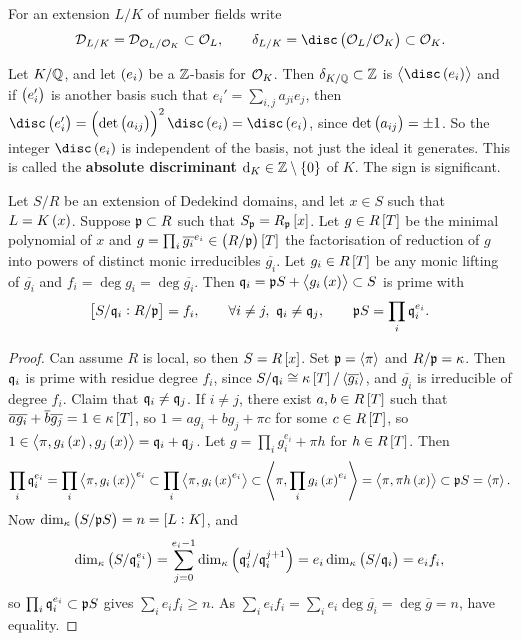 For an extension $ L / K $ of number fields write
$$ \DDD_{L / K} = \DDD_{\OOO_L / \OOO_K} \subset \OOO_L, \qquad \delta_{L / K} = \disc\br{\OOO_L / \OOO_K} \subset \OOO_K. $$

\begin{remark*}
Let $ K / \mathbb{Q} $, and let $ \br{e_i} $ be a $ \mathbb{Z} $-basis for $ \mathcal{O}_K $. Then $ \delta_{K / \mathbb{Q}} \subset \mathbb{Z} $ is $ \abr{\disc \br{e_i}} $ and if $ \br{e_i'} $ is another basis such that $ e_i' = \sum_{i, j} a_{ji}e_j $, then $ \disc \br{e_i'} = \br{\det \br{a_{ij}}}^2\disc \br{e_i} = \disc \br{e_i} $, since $ \det \br{a_{ij}} = \pm 1 $. So the integer $ \disc \br{e_i} $ is independent of the basis, not just the ideal it generates. This is called the \textbf{absolute discriminant} $ \d_K \in \ZZ \setminus \cbr{0} $ of $ K $. The sign is significant.
\end{remark*}

\begin{theorem}
Let $ S / R $ be an extension of Dedekind domains, and let $ x \in S $ such that $ L = K\br{x} $. Suppose $ \mathfrak{p} \subset R $ such that $ S_\ppp = R_\ppp\sbr{x} $. Let $ g \in R\sbr{T} $ be the minimal polynomial of $ x $ and $ g = \prod_i \overline{g_i}^{e_i} \in \br{R / \ppp}\sbr{T} $ the factorisation of reduction of $ g $ into powers of distinct monic irreducibles $ \overline{g_i} $. Let $ g_i \in R\sbr{T} $ be any monic lifting of $ \overline{g_i} $ and $ f_i = \deg g_i = \deg \overline{g_i} $. Then $ \qqq_i = \ppp S + \abr{g_i\br{x}} \subset S $ is prime with
$$ \sbr{S / \qqq_i : R / \ppp} = f_i, \qquad \forall i \ne j, \ \qqq_i \ne \qqq_j, \qquad \ppp S = \prod_i \qqq_i^{e_i}. $$
\end{theorem}

\begin{proof}
Can assume $ R $ is local, so then $ S = R\sbr{x} $. Set $ \mathfrak{p} = \left\langle \pi \right\rangle $ and $ R / \mathfrak{p} = \kappa $. Then $ \mathfrak{q}_i $ is prime with residue degree $ f_i $, since $ S / \qqq_i \cong \kappa\sbr{T} / \abr{\overline{g_i}} $, and $ \overline{g_i} $ is irreducible of degree $ f_i $. Claim that $ \mathfrak{q}_i \ne \mathfrak{q}_j $. If $ i \ne j $, there exist $ a, b \in R\sbr{T} $ such that $ \overline{a}\overline{g_i} + \overline{b}\overline{g_j} = 1 \in \kappa\sbr{T} $, so $ 1 = ag_i + bg_j + \pi c $ for some $ c \in R\sbr{T} $, so $ 1 \in \abr{\pi, g_i\br{x}, g_j\br{x}} = \qqq_i + \qqq_j $. Let $ g = \prod_i g_i^{e_i} + \pi h $ for $ h \in R\sbr{T} $. Then
$$ \prod_i \qqq_i^{e_i} = \prod_i \abr{\pi, g_i\br{x}}^{e_i} \subset \prod_i \abr{\pi, g_i\br{x}^{e_i}} \subset \abr{\pi, \prod_i g_i\br{x}^{e_i}} = \abr{\pi, \pi h\br{x}} \subset \ppp S = \abr{\pi}. $$
Now $ \dim_\kappa \br{S / \ppp S} = n = \sbr{L : K} $, and
$$ \dim_\kappa \br{S / \qqq_i^{e_i}} = \sum_{j = 0}^{e_i - 1} \dim_\kappa \br{\qqq_i^j / \qqq_i^{j + 1}} = e_i\dim_\kappa \br{S / \qqq_i} = e_if_i, $$
so $ \prod_i \mathfrak{q}_i^{e_i} \subset \mathfrak{p} S $ gives $ \sum_i e_if_i \ge n $. As $ \sum_i e_if_i = \sum_i e_i\deg \overline{g_i} = \deg \overline{g} = n $, have equality.
\end{proof}


